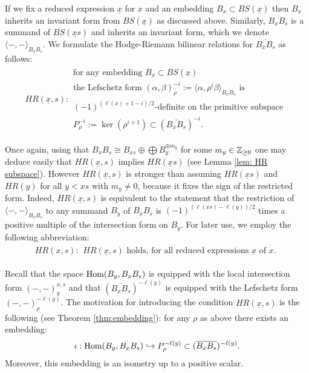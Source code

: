 \documentclass[11pt]{amsart}
\numberwithin{equation}{section}
\def\a{\alpha}
\def\b{\beta}
\def\ov{\overline}
\def\un{\underline}
\theoremstyle{definition}
\theoremstyle{remark}
\begin{document}
If we fix a reduced expression $\un{x}$ for $x$ and an embedding $B_x
\subset BS(\un{x})$ then $B_x$ inherits an
invariant form from $BS(\un{x})$ as discussed above.  Similarly, $B_x B_s$ is a summand
of $BS(\un{x}s)$ and inherits an invariant form, which we denote
$\langle -, - \rangle_{B_x B_s}$. We formulate the Hodge-Riemann bilinear relations for
$\ov{B_xB_s}$ as follows:
\begin{gather*} HR(\un{x},s): \begin{array}{c}
\text{for any embedding $B_x \subset BS(\un{x})$}\\
\text{the Lefschetz form $(\a, \b)^{-i}_\rho
:= \langle \a, \rho^i \b \rangle_{\ov{B_x B_s}}$ is}\\ \text{$(-1)^{(\ell(x) + 1 - i)/2}$-definite on the primitive subspace } \\ \text{} P^{-i}_{\rho} := \ker (\rho^{i+1}) \subset
(\ov{B_xB_s})^{-i}. \end{array} \end{gather*}

Once again, using that $B_x B_s \cong B_{xs} \oplus \bigoplus B_y^{\oplus m_y}$ for some $m_y \in {\mathbb{Z}}_{\ge 0}$ one may deduce easily that
$HR(\un{x},s)$ implies $HR(\un{x}s)$ (see Lemma \ref{lem: HR subspace}). However $HR(\un{x},s)$ is stronger than assuming $HR(\un{x}s)$ and
$HR(y)$ for all $y < xs$ with $m_y \ne 0$, because it fixes the sign of the restricted form. Indeed, $HR(\un{x},s)$ is equivalent to the statement
that the restriction of $\langle -, - \rangle_{B_xB_s}$ to any summand $B_y$ of $B_x B_s$ is $(-1)^{(\ell(xs)-\ell(y))/2}$ times a positive multiple
of the intersection form on $B_y$. For later use, we employ the following abbreviation:
\begin{gather*} HR(x,s): \begin{array}{c}
\text{$HR(\un{x},s)$ holds, for all reduced expressions $\un{x}$ of $x$.}
 \end{array} \end{gather*}

Recall that the space $\operatorname{Hom}(B_y, B_xB_s)$ is equipped with the local
intersection form $(-,-)_y^{x,s}$ and that $(\overline{B_x
  B_s})^{-\ell(y)}$ is equipped with the Lefschetz form
  $(-,-)_\rho^{-\ell(y)}$. The motivation for introducing the
  condition $HR(\un{x},s)$ is the following (see Theorem \ref{thm:embedding}):
for any $\rho$ as above there exists an embedding: \[ \iota: \operatorname{Hom}(B_y, B_xB_s) \hookrightarrow P^{-\ell(y)}_\rho \subset
(\overline{B_x B_s})^{-\ell(y)}. \] Moreover, this embedding is an isometry up to a positive scalar.
\end{document}
